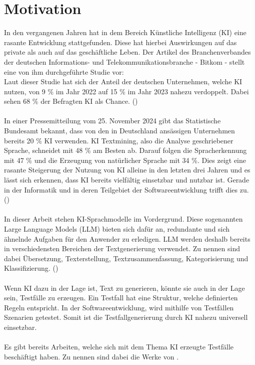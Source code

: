 \documentclass[12pt,toc=bib,toc=listof]{scrreprt}
\begin{document}
\section{Motivation} %
\label{sec:motivation}
In den vergangenen Jahren hat in dem Bereich \glqq Künstliche Intelligenz (KI)\grqq{} eine rasante Entwicklung stattgefunden. Diese hat hierbei Auswirkungen auf das private als auch auf das geschäftliche Leben. Der Artikel des Branchenverbandes der deutschen Informations- und Telekommunikationsbranche - Bitkom - stellt eine von ihm durchgeführte Studie vor:\\
\noindent Laut dieser Studie hat sich der Anteil der deutschen Unternehmen, welche KI nutzen, von 9 \% im Jahr 2022 auf 15 \% im Jahr 2023 nahezu verdoppelt. Dabei sehen 68 \% der Befragten KI als Chance. (\cite{StreimHecker2023})\\
\\
In einer Pressemitteilung vom 25. November 2024 gibt das Statistische Bundesamt bekannt, dass von den in Deutschland ansässigen Unternehmen bereits 20 \% KI verwenden. KI Textmining, also die Analyse geschriebener Sprache, schneidet mit 48 \% am Besten ab. Darauf folgen die Spracherkennung mit 47 \% und die Erzeugung von natürlicher Sprache mit 34 \%. Dies zeigt eine rasante Steigerung der Nutzung von KI alleine in den letzten drei Jahren und es lässt sich erkennen, dass KI bereits vielfältig einsetzbar und nutzbar ist. Gerade in der Informatik und in deren Teilgebiet der Softwareentwicklung trifft dies zu. (\cite{StatistischesBundesamt2024})\\
\\
In dieser Arbeit stehen KI-Sprachmodelle im Vordergrund. Diese sogenannten Large Language Models (LLM) bieten sich  dafür an, redundante und sich ähnelnde Aufgaben für den Anwender zu erledigen. LLM werden deshalb bereits in verschiedensten Bereichen der Textgenerierung verwendet. Zu nennen sind dabei Übersetzung, Texterstellung, Textzusammenfassung, Kategorisierung und Klassifizierung. (\cite{Kerner2024})\\
\\
Wenn KI dazu in der Lage ist, Text zu generieren, könnte sie auch in der Lage sein, Testfälle zu erzeugen. Ein Testfall hat eine Struktur, welche definierten Regeln entspricht. In der Softwareentwicklung, wird mithilfe von Testfällen Szenarien getestet. Somit ist die Testfallgenerierung durch KI nahezu universell einsetzbar.\\
\\
Es gibt bereits Arbeiten, welche sich mit dem Thema \glqq KI erzeugte Testfälle\grqq{} beschäftigt haben. Zu nennen sind dabei die Werke von \parencite{Bhandari2024, Gu2024, Khan2024, Kirinuki2024, Liu2024, Ouédraogo2024}.
\newpage
\end{document}

